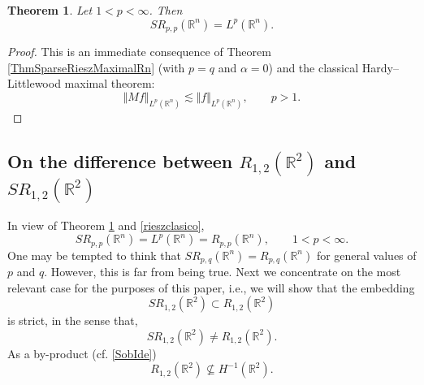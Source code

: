 \documentclass[11pt, a4paper,leqno]{amsart}
\newtheorem{theorem}{Theorem}
\theoremstyle{plain}
\numberwithin{equation}{section}
\theoremstyle{definition}
\theoremstyle{remark}
\begin{document}
\begin{theorem}
\label{CorSparLeb} Let $1<p<\infty$. Then
\[
SR_{p,p}(\mathbb{R}^{n})=L^{p}(\mathbb{R}^{n}).
\]

\end{theorem}

\begin{proof}
This is an immediate consequence of Theorem \ref{ThmSparseRieszMaximalRn}
(with $p=q$ and $\alpha=0$) and the classical Hardy--Littlewood maximal
theorem:
\[
\Vert Mf\Vert_{L^{p}(\mathbb{R}^{n})}\lesssim\Vert f\Vert_{L^{p}(\mathbb{R}%
^{n})},\qquad p>1.
\]

\end{proof}

\subsection{On the difference between $R_{1,2}(\mathbb{R}^{2})$ and
$SR_{1,2}(\mathbb{R}^{2})$\label{sec:lions}}

In view of Theorem \ref{CorSparLeb} and \eqref{rieszclasico},
\[
SR_{p,p}(\mathbb{R}^{n})=L^{p}(\mathbb{R}^{n})=R_{p,p}(\mathbb{R}^{n}%
),\qquad1<p<\infty.
\]
One may be tempted to think that $SR_{p,q}(\mathbb{R}^{n})=R_{p,q}%
(\mathbb{R}^{n})$ for general values of $p$ and $q$. However, this is far from
being true. Next we concentrate on the most relevant case for the purposes of
this paper, i.e., we will show that the embedding
\[
SR_{1,2}(\mathbb{R}^{2})\subset R_{1,2}(\mathbb{R}^{2})
\]
is strict, in the sense that,
\begin{equation}
SR_{1,2}(\mathbb{R}^{2})\neq R_{1,2}(\mathbb{R}^{2}).\label{GoalSR12}%
\end{equation}
As a by-product (cf. \eqref{SobIde})
\begin{equation}
R_{1,2}(\mathbb{R}^{2})\nsubseteq H^{-1}(\mathbb{R}^{2}).\label{agregada}%
\end{equation}
\end{document}
